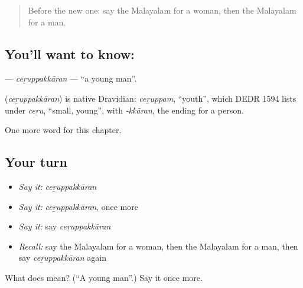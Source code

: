 \label{lesson:ML-C325-ceruppakkaran}



\begin{quote}
Before the new one: say the Malayalam for a woman, then the Malayalam for a man.
\end{quote}

\subsection*{You'll want to know: }
\textbf{} — \emph{ceṟuppakkāran} — \textquotedblleft{}a young man\textquotedblright{}.

\begin{cousinweb}
\textbf{} (\emph{ceṟuppakkāran}) is native Dravidian: \emph{ceṟuppam}, \textquotedblleft{}youth\textquotedblright{}, which DEDR 1594 lists under \emph{ceṟu}, \textquotedblleft{}small, young\textquotedblright{}, with \emph{-kkāran}, the ending for a person.
\end{cousinweb}

\begin{grammarlens}[title={What you've built}]
One more word for this chapter.
\end{grammarlens}

\subsection*{Your turn}
\begin{itemize}
\raggedright
  \item \emph{Say it:} \emph{ceṟuppakkāran}
  \item \emph{Say it:} \emph{ceṟuppakkāran}, once more
  \item \emph{Say it:} say \emph{ceṟuppakkāran}
  \item \emph{Recall:} say the Malayalam for a woman, then the Malayalam for a man, then say \emph{ceṟuppakkāran} again
\end{itemize}

\begin{tcolorbox}[breakable,colback=teal!4,colframe=teal!35!black,title={Before you move on}]
What does  mean? (\textquotedblleft{}A young man\textquotedblright{}.) Say it once more.
\end{tcolorbox}
